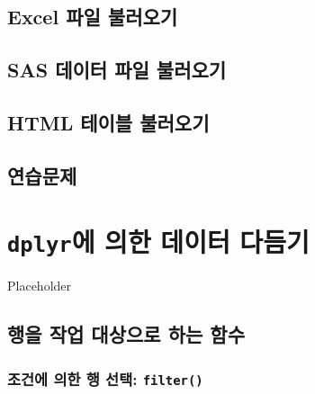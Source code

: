 \documentclass[
]{book}
\begin{document}
\hypertarget{excel-uxd30cuxc77c-uxbd88uxb7ecuxc624uxae30}{%
\section{Excel 파일 불러오기}\label{excel-uxd30cuxc77c-uxbd88uxb7ecuxc624uxae30}}

\hypertarget{sas-uxb370uxc774uxd130-uxd30cuxc77c-uxbd88uxb7ecuxc624uxae30}{%
\section{SAS 데이터 파일 불러오기}\label{sas-uxb370uxc774uxd130-uxd30cuxc77c-uxbd88uxb7ecuxc624uxae30}}

\hypertarget{html-uxd14cuxc774uxbe14-uxbd88uxb7ecuxc624uxae30}{%
\section{HTML 테이블 불러오기}\label{html-uxd14cuxc774uxbe14-uxbd88uxb7ecuxc624uxae30}}

\hypertarget{uxc5f0uxc2b5uxbb38uxc81c-1}{%
\section{연습문제}\label{uxc5f0uxc2b5uxbb38uxc81c-1}}

\hypertarget{dplyruxc5d0-uxc758uxd55c-uxb370uxc774uxd130-uxb2e4uxb4ecuxae30}{%
\chapter{\texorpdfstring{\texttt{dplyr}에 의한 데이터 다듬기}{dplyr에 의한 데이터 다듬기}}\label{dplyruxc5d0-uxc758uxd55c-uxb370uxc774uxd130-uxb2e4uxb4ecuxae30}}

Placeholder

\hypertarget{uxd589uxc744-uxc791uxc5c5-uxb300uxc0c1uxc73cuxb85c-uxd558uxb294-uxd568uxc218}{%
\section{행을 작업 대상으로 하는 함수}\label{uxd589uxc744-uxc791uxc5c5-uxb300uxc0c1uxc73cuxb85c-uxd558uxb294-uxd568uxc218}}

\hypertarget{uxc870uxac74uxc5d0-uxc758uxd55c-uxd589-uxc120uxd0dd-filter}{%
\subsection{\texorpdfstring{조건에 의한 행 선택: \texttt{filter()}}{조건에 의한 행 선택: filter()}}\label{uxc870uxac74uxc5d0-uxc758uxd55c-uxd589-uxc120uxd0dd-filter}}
\end{document}
